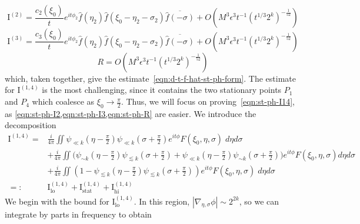 \documentclass[letterpaper, reqno,final]{amsart}
\newcommand{\fhPi}{\frac{\pi}{2}}
\newcommand{\rmI}{\mathrm{I}}
\newcommand{\deles}{\nabla_{\eta,\sigma}}
\newcommand{\bigO}[1]{O\left({#1}\right)}
\newcommand{\stPhErr}{{\frac{1}{52}}}
\begin{document}
\begin{equation}\label{eqn:st-ph-I2}
    \rmI^{(2)} = \frac{c_2(\xi_0)}{t}e^{it\phi_2}\hat{f}(\eta_2)\hat{f}(\xi_0 - \eta_2 - \sigma_2) \overline{\hat{f}(-\sigma)} + \bigO{M^3\epsilon^3 t^{-1} \left(t^{1/3} 2^k\right)^{-\stPhErr}}
\end{equation}
\begin{equation}\label{eqn:st-ph-I3}
    \rmI^{(3)} = \frac{c_3(\xi_0)}{t}e^{it\phi_2}\hat{f}(\eta_2)\hat{f}(\xi_0 - \eta_2 - \sigma_2) \overline{\hat{f}(-\sigma)} + \bigO{M^3\epsilon^3 t^{-1} \left(t^{1/3} 2^k\right)^{-\stPhErr}}
\end{equation}
\begin{equation}\label{eqn:st-ph-R}
    R = \bigO{M^3\epsilon^3 t^{-1} \left(t^{1/3} 2^k\right)^{-\stPhErr}}
\end{equation}
which, taken together, give the estimate~\eqref{eqn:d-t-f-hat-st-ph-form}.  The estimate for $\rmI^{(1,4)}$ is the most challenging, since it contains the two stationary points $P_1$ and $P_4$ which coalesce as $\xi_0 \to \fhPi$.  Thus, we will focus on proving~\eqref{eqn:st-ph-I14}, as \cref{eqn:st-ph-I2,eqn:st-ph-I3,eqn:st-ph-R} are easier.  We introduce the decomposition
\begin{equation*}\begin{split}
    \rmI^{(1,4)} =& \frac{i}{4\pi} \iint \psi_{\ll k}(\eta - \fhPi) \psi_{\ll k}(\sigma + \fhPi) e^{it\phi} F(\xi_0,\eta,\sigma)\;d\eta d\sigma\\
    &+ \frac{i}{4\pi} \iint \biggl(\psi_{\sim k}(\eta - \fhPi) \psi_{\lesssim k}(\sigma + \fhPi) + \psi_{\ll k}(\eta - \fhPi) \psi_{\sim k}(\sigma + \fhPi)\biggr) e^{it\phi} F(\xi_0,\eta,\sigma)d\eta d\sigma\\
    &+ \frac{i}{4\pi} \iint \left(1 - \psi_{\lesssim k}(\eta - \fhPi) \psi_{\lesssim k}(\sigma + \fhPi)\right) e^{it\phi} F(\xi_0,\eta,\sigma)\;d\eta d\sigma\\
    =:& \rmI^{(1,4)}_\text{lo} + \rmI^{(1,4)}_\text{stat} + \rmI^{(1,4)}_\text{hi}
\end{split}\end{equation*}
We begin with the bound for $\rmI^{(1,4)}_{\text{lo}}$.  In this region, $|\deles \phi| \sim 2^{2k}$, so we can integrate by parts in frequency to obtain
\end{document}
